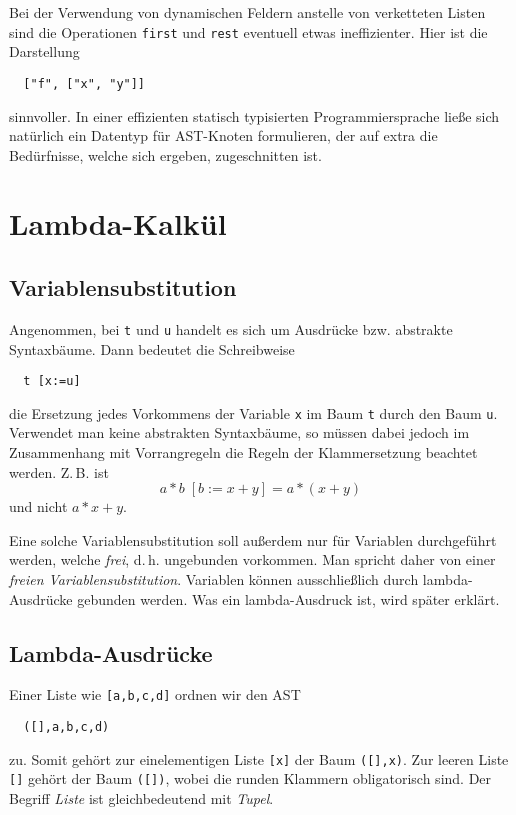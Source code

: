 \documentclass[a4paper,11pt,fleqn,twocolumn,twoside]{article}
\numberwithin{equation}{section}
\begin{document}
Bei der Verwendung von dynamischen Feldern anstelle von verketteten
Listen sind die Operationen \texttt{first} und \texttt{rest} eventuell
etwas ineffizienter. Hier ist die Darstellung
\begin{verbatim}
  ["f", ["x", "y"]]
\end{verbatim}
sinnvoller. In einer effizienten statisch typisierten
Programmiersprache ließe sich natürlich ein Datentyp für AST-Knoten
formulieren, der auf extra die Bedürfnisse, welche sich ergeben,
zugeschnitten ist.

\section{Lambda-Kalkül}
\subsection{Variablensubstitution}
Angenommen, bei \texttt{t} und \texttt{u} handelt es sich um Ausdrücke
bzw. abstrakte Syntaxbäume. Dann bedeutet die Schreibweise
\begin{verbatim}
  t [x:=u]
\end{verbatim}
die Ersetzung jedes Vorkommens der Variable \texttt{x} im Baum
\texttt{t} durch den Baum \texttt{u}. Verwendet man keine abstrakten
Syntaxbäume, so müssen dabei jedoch im Zusammenhang mit Vorrangregeln
die Regeln der Klammersetzung beachtet werden. Z.\,B. ist
\begin{equation}
  a*b\;[b:=x+y] = a*(x+y)
\end{equation}
und nicht $a*x+y$.

Eine solche Variablensubstitution soll außerdem nur für
Variablen durchgeführt werden, welche \emph{frei}, d.\,h. ungebunden
vorkommen. Man spricht daher von einer
\emph{freien Variablensubstitution}. Variablen können ausschließlich
durch lambda-Ausdrücke gebunden werden. Was ein lambda-Ausdruck ist,
wird später erklärt.

\subsection{Lambda-Ausdrücke}
Einer Liste wie \verb|[a,b,c,d]| ordnen wir den AST
\begin{verbatim}
  ([],a,b,c,d)
\end{verbatim}
zu. Somit gehört zur einelementigen Liste \verb|[x]| der Baum
\verb|([],x)|. Zur leeren Liste \verb|[]| gehört der Baum \verb|([])|,
wobei die runden Klammern obligatorisch sind.
Der Begriff \emph{Liste} ist gleichbedeutend mit \emph{Tupel}.
\end{document}
